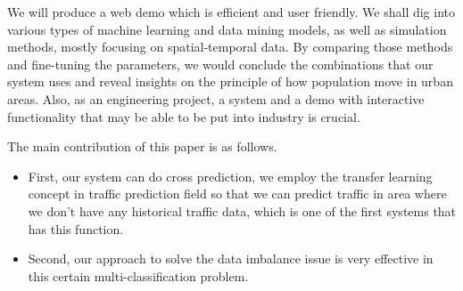 
We will produce a web demo which is efficient and user friendly. We shall dig into various types of machine learning and data mining models, as well as simulation methods, mostly focusing on spatial-temporal data. By comparing those methods and fine-tuning the parameters, we would conclude the combinations that our system uses and reveal insights on the principle of how population move in urban areas. Also, as an engineering project, a system and a demo with interactive functionality that may be able to be put into industry is crucial.

The main contribution of this paper is as follows.

\begin{itemize}
\item First, our system can do cross prediction, we employ the transfer learning concept
in traffic prediction field so that we can predict traffic in area where we don't have any historical traffic data, which is one of the first systems that has this function.

\item Second, our approach to solve the data imbalance issue is very effective in this certain multi-classification problem. 





\end{itemize}
